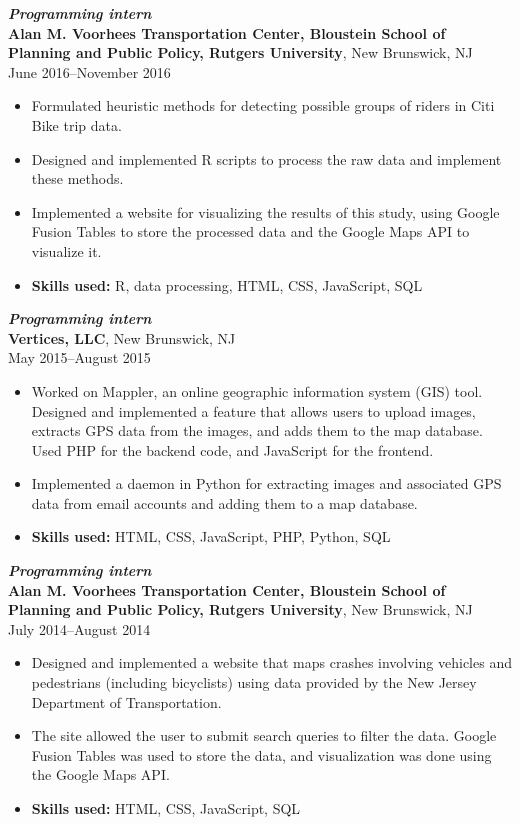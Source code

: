 \documentclass[letterpaper,12pt]{article}
\begin{document}
\textit{\textbf{Programming intern}} \\
\textbf{Alan M. Voorhees Transportation Center, Bloustein School of
  Planning and Public Policy, Rutgers University},
New Brunswick, NJ \\
June 2016--November 2016
\begin{itemize}
\item Formulated heuristic methods for detecting possible groups of
  riders in Citi Bike trip data.
\item Designed and implemented R scripts to process the raw data and
  implement these methods.

\item Implemented a website for visualizing the results of this study,
  using Google Fusion Tables to store the processed data and the
  Google Maps API to visualize it.

\item \textbf{Skills used:} R, data processing, HTML, CSS, JavaScript,
  SQL
\end{itemize}

\textit{\textbf{Programming intern}} \\
\textbf{Vertices, LLC}, New Brunswick, NJ \\
May 2015--August 2015
\begin{itemize}
\item Worked on Mappler, an online geographic information system (GIS)
  tool. Designed and implemented a feature that allows users to upload
  images, extracts GPS data from the images, and adds them to the map
  database. Used PHP for the backend code, and JavaScript for the
  frontend.
\item Implemented a daemon in Python for extracting images and
  associated GPS data from email accounts and adding them to a map
  database.
\item \textbf{Skills used:} HTML, CSS, JavaScript, PHP, Python, SQL
\end{itemize}

\textit{\textbf{Programming intern}} \\
\textbf{Alan M. Voorhees Transportation Center, Bloustein School of
  Planning and Public Policy, Rutgers University},
New Brunswick, NJ \\
July 2014--August 2014
\begin{itemize}
\item Designed and implemented a website that maps crashes involving
  vehicles and pedestrians (including bicyclists) using data provided
  by the New Jersey Department of Transportation.
\item The site allowed the user to submit search queries to filter the
  data. Google Fusion Tables was used to store the data, and
  visualization was done using the Google Maps API.
\item \textbf{Skills used:} HTML, CSS, JavaScript, SQL
\end{itemize}
\end{document}
